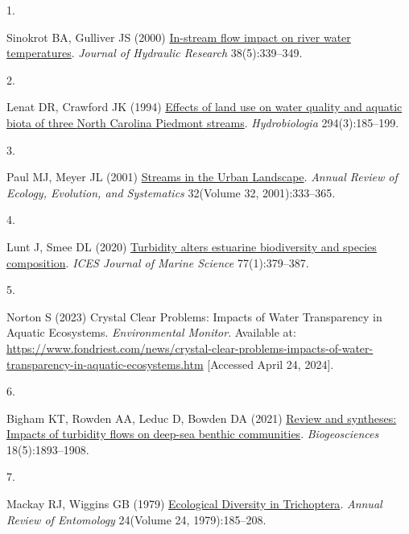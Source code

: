 \documentclass[9pt,twocolumn,twoside,]{pnas-new}
\newlength{\cslhangindent}
\newlength{\csllabelwidth}
\newlength{\cslentryspacingunit} %
\newenvironment{CSLReferences}[2] %
 {%
  \setlength{\parindent}{0pt}
  \ifodd #1
  \let\oldpar\par
  \def\par{\hangindent=\cslhangindent\oldpar}
  \fi
  \setlength{\parskip}{#2\cslentryspacingunit}
 }%
 {}
\newcommand{\CSLLeftMargin}[1]{\parbox[t]{\csllabelwidth}{#1}}
\newcommand{\CSLRightInline}[1]{\parbox[t]{\linewidth - \csllabelwidth}{#1}\break}
\begin{document}
\hypertarget{refs}{}
\begin{CSLReferences}{0}{0}
\leavevmode{}%
\CSLLeftMargin{1. }%
\CSLRightInline{Sinokrot BA, Gulliver JS (2000)
\href{https://doi.org/10.1080/00221680009498315}{In-stream flow impact
on river water temperatures}. \emph{Journal of Hydraulic Research}
38(5):339--349.}

\leavevmode{}%
\CSLLeftMargin{2. }%
\CSLRightInline{Lenat DR, Crawford JK (1994)
\href{https://doi.org/10.1007/BF00021291}{Effects of land use on water
quality and aquatic biota of three {North} {Carolina} {Piedmont}
streams}. \emph{Hydrobiologia} 294(3):185--199.}

\leavevmode{}%
\CSLLeftMargin{3. }%
\CSLRightInline{Paul MJ, Meyer JL (2001)
\href{https://doi.org/10.1146/annurev.ecolsys.32.081501.114040}{Streams
in the {Urban} {Landscape}}. \emph{Annual Review of Ecology, Evolution,
and Systematics} 32(Volume 32, 2001):333--365.}

\leavevmode{}%
\CSLLeftMargin{4. }%
\CSLRightInline{Lunt J, Smee DL (2020)
\href{https://doi.org/10.1093/icesjms/fsz214}{Turbidity alters estuarine
biodiversity and species composition}. \emph{ICES Journal of Marine
Science} 77(1):379--387.}

\leavevmode{}%
\CSLLeftMargin{5. }%
\CSLRightInline{Norton S (2023) Crystal {Clear} {Problems}: {Impacts} of
{Water} {Transparency} in {Aquatic} {Ecosystems}. \emph{Environmental
Monitor}. Available at:
\url{https://www.fondriest.com/news/crystal-clear-problems-impacts-of-water-transparency-in-aquatic-ecosystems.htm}
{[}Accessed April 24, 2024{]}.}

\leavevmode{}%
\CSLLeftMargin{6. }%
\CSLRightInline{Bigham KT, Rowden AA, Leduc D, Bowden DA (2021)
\href{https://doi.org/10.5194/bg-18-1893-2021}{Review and syntheses:
{Impacts} of turbidity flows on deep-sea benthic communities}.
\emph{Biogeosciences} 18(5):1893--1908.}

\leavevmode{}%
\CSLLeftMargin{7. }%
\CSLRightInline{Mackay RJ, Wiggins GB (1979)
\href{https://doi.org/10.1146/annurev.en.24.010179.001153}{Ecological
{Diversity} in {Trichoptera}}. \emph{Annual Review of Entomology}
24(Volume 24, 1979):185--208.}


\end{CSLReferences}
\end{document}
